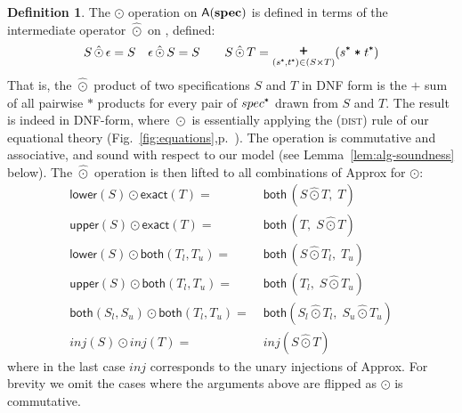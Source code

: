\documentclass[9pt,preprint]{sigplanconf}
\newcounter{block}
\theoremstyle{definition}
\newtheorem{definition}[block]{Definition}
\newcommand{\term}[1]{\texttt{#1}}
\newcommand{\trule}[1]{{\footnotesize{#1}}}
\begin{document}
\begin{definition} The $\odot$ operation on $\textsf{A}(\textbf{spec}{})$
  is defined in terms of the intermediate operator $\hat{\odot}$ on
  \specDNF{}, defined:
\begin{align*}
S \,\hat{\odot}\, \epsilon = S \quad
\epsilon \,\hat{\odot}\, S = S \qquad
S \,\hat{\odot}\, T = \bplus_{(\tyProd{s}, \tyProd{t}) \in (S \times
   T)} (\tyProd{s} \; \term{*} \; \tyProd{t})
\end{align*}
That is, the $\hat{\odot}$ product of two specifications $S$ and $T$ in DNF form 
is the $\term{+}$ sum of all pairwise $\term{*}$ products for every
pair of $\tyProd{spec}$ drawn from $S$ and $T$. The result
is indeed in DNF-form, where $\hat{\odot}$ is essentially applying
 the (\trule{\textsc{dist}}) rule of our equational theory
 (Fig.~\ref{fig:equations},p.~\pageref{fig:equations}). The operation is
commutative and associative, and sound with respect to our
model (see Lemma~\ref{lem:alg-soundness} below).
The $\hat{\odot}$ operation is then lifted to all combinations of
\textsf{Approx} for $\odot$:
\begin{align*}
\textsf{lower}(S) \odot \textsf{exact}(T) = \; &
       \textsf{both} \, (S \hat{\odot} T, \; T) \\
\textsf{upper}(S) \odot \textsf{exact}(T) = \; & 
       \textsf{both} \, (T, \; S \hat{\odot} T) \\
\textsf{lower}(S) \odot \textsf{both}(T_l,T_u) = \; &
        \textsf{both} \, (S \hat{\odot} T_l, \; T_u) \\
\textsf{upper}(S) \odot \textsf{both}(T_l,T_u) = \; & \textsf{both} \,
                                                      (T_l, \; S \hat{\odot} T_u) \\
\textsf{both}(S_l,S_u) \odot
\textsf{both}(T_l,T_u)  = \; & \textsf{both} (S_l \hat{\odot} T_l, \; S_u
                         \hat{\odot} T_u) \\
\textit{inj}(S) \odot \textit{inj}(T) = \; & \textit{inj}(S
                                              \hat{\odot} T)
\end{align*}
where in the last case $\textit{inj}$ corresponds to the unary
injections of \textsf{Approx}. For brevity we omit the cases where the arguments above are flipped
as $\odot$ is commutative.
\end{definition}
\end{document}
